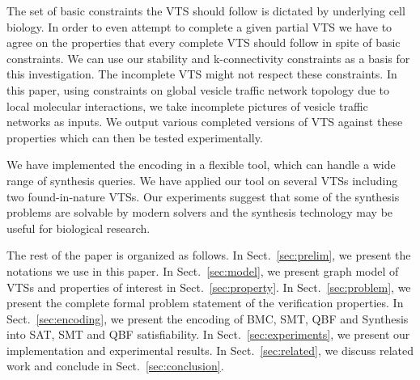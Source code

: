 %
The set of basic constraints the VTS should follow is dictated by underlying cell biology.   
%
In order to even attempt to complete a given partial VTS we have to agree on the properties that every complete VTS should follow in spite of basic constraints. 
%
We can use our stability and k-connectivity constraints as a basis for this investigation.   
%
The incomplete VTS might not respect these constraints. 
%
In this paper, using constraints on global vesicle traffic network topology due to local molecular interactions, we take incomplete pictures of vesicle traffic networks as inputs.
%
We output various completed versions of VTS against these properties which can then be tested experimentally.
%

We have implemented the encoding in a flexible tool, which can handle a wide range of synthesis queries. 
%
We have applied our tool on several VTSs including
two found-in-nature VTSs.
%
Our experiments suggest that some of the synthesis problems are solvable by modern solvers and the synthesis technology may be useful for biological research.
%

The rest of the paper is organized as follows. 
%
In Sect.~\ref{sec:prelim}, we present the notations we use in this paper. 
%
In Sect.~\ref{sec:model}, we present graph model of VTSs and  properties of interest in Sect.~\ref{sec:property}.
%
%
%
In Sect.~\ref{sec:problem}, we present the complete formal problem statement of the verification properties.
%
In Sect.~\ref{sec:encoding}, we present the encoding of BMC, SMT, QBF and Synthesis into SAT, SMT and QBF satisfiability. 
%
In Sect.~\ref{sec:experiments}, we present our implementation and experimental results. 
%
In Sect.~\ref{sec:related}, we discuss related work and conclude in Sect.~\ref{sec:conclusion}.



